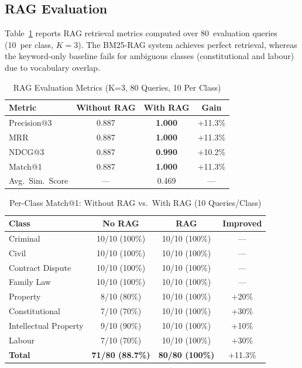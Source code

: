 \documentclass[conference]{IEEEtran}
\begin{document}
\subsection{RAG Evaluation}

Table~\ref{tab:rag_metrics} reports RAG retrieval metrics computed over
80~evaluation queries (10~per class, $K=3$). The BM25-RAG system achieves
perfect retrieval, whereas the keyword-only baseline fails for ambiguous
classes (constitutional and labour) due to vocabulary overlap.

\begin{table}[ht]
\centering
\caption{RAG Evaluation Metrics (K=3, 80 Queries, 10 Per Class)}
\label{tab:rag_metrics}
\renewcommand{\arraystretch}{1.15}
\begin{tabular}{lccc}
\toprule
\textbf{Metric} & \textbf{Without RAG} & \textbf{With RAG} & \textbf{Gain} \\
\midrule
Precision@3     & 0.887 & \textbf{1.000} & $+$11.3\% \\
MRR             & 0.887 & \textbf{1.000} & $+$11.3\% \\
NDCG@3          & 0.887 & \textbf{0.990} & $+$10.2\% \\
Match@1         & 0.887 & \textbf{1.000} & $+$11.3\% \\
Avg.\ Sim.\ Score & ---  & 0.469          & ---        \\
\bottomrule
\end{tabular}
\end{table}

\begin{table}[ht]
\centering
\caption{Per-Class Match@1: Without RAG vs.\ With RAG (10 Queries/Class)}
\label{tab:perclass_rag}
\renewcommand{\arraystretch}{1.1}
\begin{tabular}{lccc}
\toprule
\textbf{Class} & \textbf{No RAG} & \textbf{RAG} & \textbf{Improved} \\
\midrule
Criminal             & 10/10 (100\%) & 10/10 (100\%) & ---     \\
Civil                & 10/10 (100\%) & 10/10 (100\%) & ---     \\
Contract Dispute     & 10/10 (100\%) & 10/10 (100\%) & ---     \\
Family Law           & 10/10 (100\%) & 10/10 (100\%) & ---     \\
Property             & 8/10  (80\%)  & 10/10 (100\%) & $+$20\% \\
Constitutional       & 7/10  (70\%)  & 10/10 (100\%) & $+$30\% \\
Intellectual Property& 9/10  (90\%)  & 10/10 (100\%) & $+$10\% \\
Labour               & 7/10  (70\%)  & 10/10 (100\%) & $+$30\% \\
\midrule
\textbf{Total} & \textbf{71/80 (88.7\%)} & \textbf{80/80 (100\%)} & $+$11.3\% \\
\bottomrule
\end{tabular}
\end{table}
\end{document}
